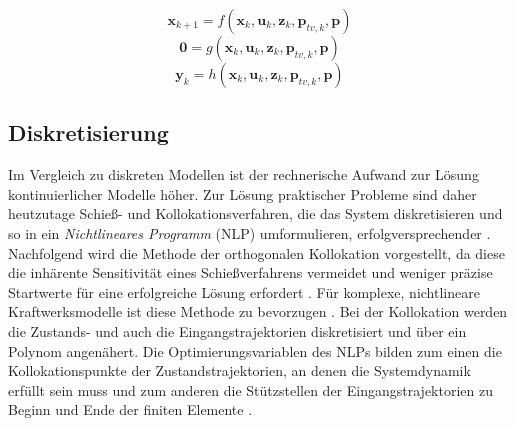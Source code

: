 \begin{equation} \label{eq_Modellbildung1}
\boldsymbol{x}_{k+1} = f(\boldsymbol{x}_k, \boldsymbol{u}_k, \boldsymbol{z}_k, \boldsymbol{p}_{tv,k}, \boldsymbol{p})
\end{equation}
\vspace*{-2.5\baselineskip}
\begin{equation} \label{eq_Modellbildung2}
\mathbf{0} = g(\boldsymbol{x}_k, \boldsymbol{u}_k, \boldsymbol{z}_k, \boldsymbol{p}_{tv,k}, \boldsymbol{p})
\end{equation}
\vspace*{-2.5\baselineskip}
\begin{equation} \label{eq_Modellbildung3}
\boldsymbol{y}_k = h(\boldsymbol{x}_k, \boldsymbol{u}_k, \boldsymbol{z}_k, \boldsymbol{p}_{tv,k}, \boldsymbol{p})
\end{equation}

\subsection{Diskretisierung} \label{subsec_Diskretisierung}
Im Vergleich zu diskreten Modellen ist der rechnerische Aufwand zur Lösung kontinuierlicher Modelle höher.
Zur Lösung praktischer Probleme sind daher heutzutage Schieß- und Kollokationsverfahren, die das System diskretisieren und so in ein \textit{Nichtlineares Programm} (NLP) umformulieren, erfolgversprechender \cite[S.63]{DissGall}.
Nachfolgend wird die Methode der orthogonalen Kollokation vorgestellt, da diese die inhärente Sensitivität eines Schießverfahrens vermeidet und weniger präzise Startwerte für eine erfolgreiche Lösung erfordert \cite[S.981]{Enright}.
Für komplexe, nichtlineare Kraftwerksmodelle ist diese Methode zu bevorzugen \cite[S.247]{Bausa}.
Bei der Kollokation werden die Zustands- und auch die Eingangstrajektorien diskretisiert und über ein Polynom angenähert.
Die Optimierungsvariablen des NLPs bilden zum einen die Kollokationspunkte der Zustandstrajektorien, an denen die Systemdynamik erfüllt sein muss und zum anderen die Stützstellen der Eingangstrajektorien zu Beginn und Ende der finiten Elemente \cite[S.63-64]{DissGall}\cite[S.2]{Cizniar}.

